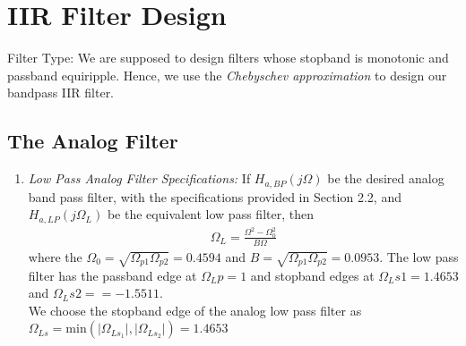\documentclass[journal,12pt,twocolumn]{IEEEtran}
\begin{document}
\section{IIR Filter Design}
Filter Type: We are supposed to design filters whose stopband is monotonic and passband equiripple.  
Hence, we use the {\em Chebyschev approximation} to design our bandpass IIR filter.
\subsection{\textbf{The Analog Filter}}
\begin{enumerate}
\item {\em{Low Pass Analog Filter Specifications:}}  If $H_{a, BP}(j\Omega)$ be the desired analog band
pass filter,  with the specifications provided in Section 2.2, and $H_{a,LP}(j\Omega_L)$ 
be the equivalent low pass filter, then 
\begin{align}
\Omega_L = \frac{\Omega^2 - \Omega_0^2}{B\Omega}
\end{align}
where the $\Omega_0 = \sqrt{\Omega_{p1}\Omega_{p2}} = 0.4594$ and $B = \sqrt{\Omega_{p1}\Omega_{p2}} = 0.0953. $ The
low pass filter has the passband edge at $ \Omega_Lp = 1$  and stopband edges at $\Omega_Ls1 = 1.4653 $ and $\Omega_Ls2 = = −1.5511. $\\ We choose the stopband edge of the analog low pass filter as $\Omega_{Ls} = \mbox{min}(\vert \Omega_{Ls_1}\vert,\vert \Omega_{Ls_2}\vert) = 1.4653 $     \\


\end{enumerate}
\end{document}
